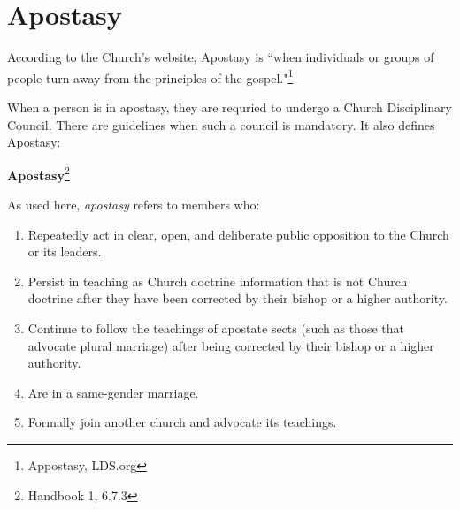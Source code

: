 \chapter{Apostasy}

According to the Church's website, Apostasy is ``when individuals or groups of people
turn away from the principles of the gospel."\footnote{Appostasy, LDS.org}

When a person is in apostasy, they are requried to undergo a Church Disciplinary
Council. There are guidelines when such a council is mandatory. It also defines
Apostasy:

\begin{displayquote}
\textbf{Apostasy}\footnote{Handbook 1, 6.7.3}

As used here, \textit{apostasy} refers to members who:

\begin{enumerate}
\item Repeatedly act in clear, open, and deliberate public opposition to the Church 
  or its leaders.

\item Persist in teaching as Church doctrine information that is not Church doctrine 
  after they have been corrected by their bishop or a higher authority.

\item Continue to follow the teachings of apostate sects (such as those that advocate 
  plural marriage) after being corrected by their bishop or a higher authority.

\item Are in a same-gender marriage.

\item Formally join another church and advocate its teachings.
\end{enumerate}
\end{displayquote}